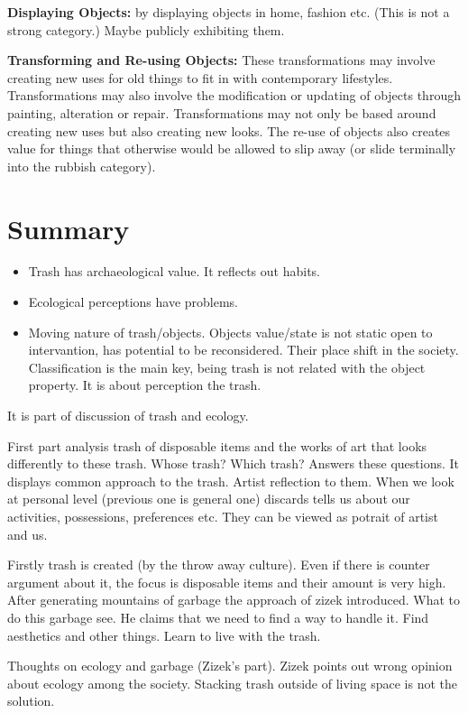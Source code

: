 \textbf{Displaying Objects:} by displaying objects in home, fashion etc. (This is not a strong category.) Maybe publicly exhibiting them. 

\textbf{Transforming and Re-using Objects:} These transformations may involve creating new uses for old things to fit in with contemporary lifestyles. Transformations may also involve the modification or updating of objects through painting, alteration or repair. Transformations may not only be based around creating new uses but also creating new looks. The re-use of objects also creates value for things that otherwise would be allowed to slip away (or slide terminally into the rubbish category).





%
%
\section{Summary}
\begin{itemize}
\item Trash has archaeological value. It reflects out habits.
\item Ecological perceptions have problems. 
\item Moving nature of trash/objects. Objects value/state is not static open to intervantion, has potential to be reconsidered. Their place shift in the society. Classification is the main key, being trash is not related with the object property. It is about perception the trash.
\end{itemize}

It is part of discussion of trash and ecology.

First part analysis trash of disposable items and the works of art that looks differently to these trash. Whose trash? Which trash? Answers these questions. It displays common approach to the trash. Artist reflection to them. When we look at personal level (previous one is general one) discards tells us about our activities, possessions, preferences etc. They can be viewed as potrait of artist and us.

Firstly trash is created (by the throw away culture). Even if there is counter argument about it, the focus is disposable items and their amount is very high. After generating mountains of garbage the approach of zizek introduced. What to do this garbage see. He claims that we need to find a way to handle it. Find aesthetics and other things. Learn to live with the trash.

Thoughts on ecology and garbage (Zizek's part). Zizek points out wrong opinion about ecology among the society. Stacking trash outside of living space is not the solution.

